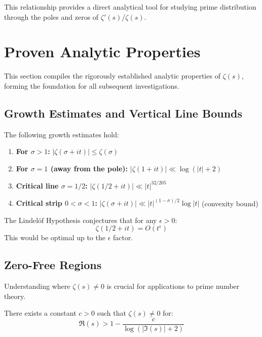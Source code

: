This relationship provides a direct analytical tool for studying prime distribution through the poles and zeros of $\zeta'(s)/\zeta(s)$.

\section{Proven Analytic Properties}
\label{sec:analytic_properties}

This section compiles the rigorously established analytic properties of $\zeta(s)$, forming the foundation for all subsequent investigations.

\subsection{Growth Estimates and Vertical Line Bounds}

\begin{theorem}
\label{thm:growth_bounds}
The following growth estimates hold:
\begin{enumerate}[label=(\alph*)]
\item \textbf{For $\sigma > 1$:} $|\zeta(\sigma + it)| \leq \zeta(\sigma)$
\item \textbf{For $\sigma = 1$ (away from the pole):} $|\zeta(1 + it)| \ll \log(|t| + 2)$
\item \textbf{Critical line $\sigma = 1/2$:} $|\zeta(1/2 + it)| \ll |t|^{32/205}$ \cite{soundararajan2008}
\item \textbf{Critical strip $0 < \sigma < 1$:} $|\zeta(\sigma + it)| \ll |t|^{(1-\sigma)/2} \log |t|$ (convexity bound)
\end{enumerate}
\end{theorem}

\begin{openproblem}
The Lindelöf Hypothesis conjectures that for any $\epsilon > 0$:
\[
\zeta(1/2 + it) = O(t^{\epsilon})
\]
This would be optimal up to the $\epsilon$ factor.
\end{openproblem}

\subsection{Zero-Free Regions}

Understanding where $\zeta(s) \neq 0$ is crucial for applications to prime number theory.

\begin{theorem}
\label{thm:classical_zerofree}
There exists a constant $c > 0$ such that $\zeta(s) \neq 0$ for:
\begin{equation}
\Re(s) > 1 - \frac{c}{\log(|\Im(s)| + 2)}
\end{equation}
\end{theorem}

